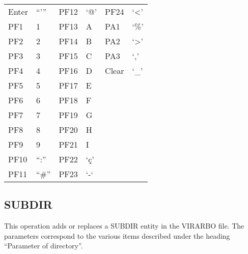 \documentclass[letterpaper,10pt,english]{sphinxmanual}
\begin{document}
\begin{savenotes}\sphinxattablestart
\centering
\begin{tabulary}{\linewidth}[t]{|T|T|T|T|T|T|}
\hline
{}\relax &\relax &\relax &\relax &\relax &\relax \\
\hline
Enter
&
“’”
&
PF12
&
‘@’
&
PF24
&
‘\textless{}’
\\
\hline
PF1
&
1
&
PF13
&
A
&
PA1
&
‘\%’
\\
\hline
PF2
&
2
&
PF14
&
B
&
PA2
&
‘\textgreater{}’
\\
\hline
PF3
&
3
&
PF15
&
C
&
PA3
&
‘,’
\\
\hline
PF4
&
4
&
PF16
&
D
&
Clear
&
‘\_’
\\
\hline
PF5
&
5
&
PF17
&
E
&&\\
\hline
PF6
&
6
&
PF18
&
F
&&\\
\hline
PF7
&
7
&
PF19
&
G
&&\\
\hline
PF8
&
8
&
PF20
&
H
&&\\
\hline
PF9
&
9
&
PF21
&
I
&&\\
\hline
PF10
&
“:”
&
PF22
&
‘ç’
&&\\
\hline
PF11
&
“\#”
&
PF23
&
‘-‘
&&\\
\hline
\end{tabulary}
\par
\sphinxattableend\end{savenotes}


\subsection{SUBDIR}
\label{\detokenize{Installation_Guide:index-172}}\label{\detokenize{Installation_Guide:subdir}}
This operation adds or replaces a SUBDIR entity in the VIRARBO file. The parameters correspond to the various items described under the heading “Parameter of directory”.
\end{document}

